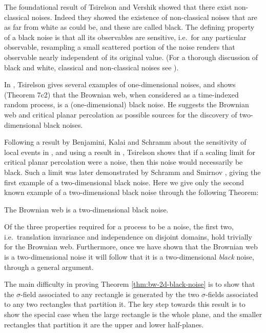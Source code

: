 {The foundational result of Tsirelson and Vershik \cite{tsirelson-vershik} showed that there
exist non-classical noises.  Indeed they showed the existence of non-classical noises
that are as far from white as could be, and these are called black.  The
defining property of a black noise is that all its observables are
sensitive, i.e.\ for any particular observable, resampling
a small scattered portion of the noise
renders that observable nearly independent of its original
value.  (For a thorough discussion of black and white, classical
and non-classical noises see \cite{tsirelson-nonclassical-stochastic-flows}).

In \cite{tsirelson-scaling-limit-noise-stability}, Tsirelson gives
several examples of one-dimensional noises, and shows (Theorem
7c2) that the Brownian web, when considered as a time-indexed random
process, is a (one-dimensional) black noise.  He suggests the Brownian
web and critical planar percolation as possible sources for the
discovery of two-dimensional black noises.

Following a result by Benjamini, Kalai and Schramm about the
sensitivity of local events in \cite{bks}, and using a result in
\cite{smirnov-werner}, Tsirelson shows that if a scaling limit for
critical planar percolation were a noise, then this noise would
necessarily be black. Such a limit was later demonstrated by Schramm
and Smirnov \cite{schramm-smirnov}, giving the first example of a
two-dimensional black noise. Here we give only the second known
example of a two-dimensional black noise through the following
Theorem:

\begin{theorem}
\label{thm:bw-2d-black-noise}
The Brownian web is a
two-dimensional black noise.
\end{theorem}

Of the three properties required for a process to be a noise, the
first two, i.e.\ translation invariance and independence on disjoint
domains, hold trivially for the Brownian web.  Furthermore, once we
have shown that the Brownian web is a two-dimensional noise it will
follow that it is a two-dimensional \emph{black} noise,
through a general argument.

The main difficulty in proving
Theorem \ref{thm:bw-2d-black-noise} is to show that the $\sigma$-field
associated to any rectangle is generated by the two $\sigma$-fields
associated to any two rectangles that partition it.
The key step towards this result is to show the special case
when the large rectangle is the whole plane, and the smaller
rectangles that partition it are the upper and lower half-planes.

}
